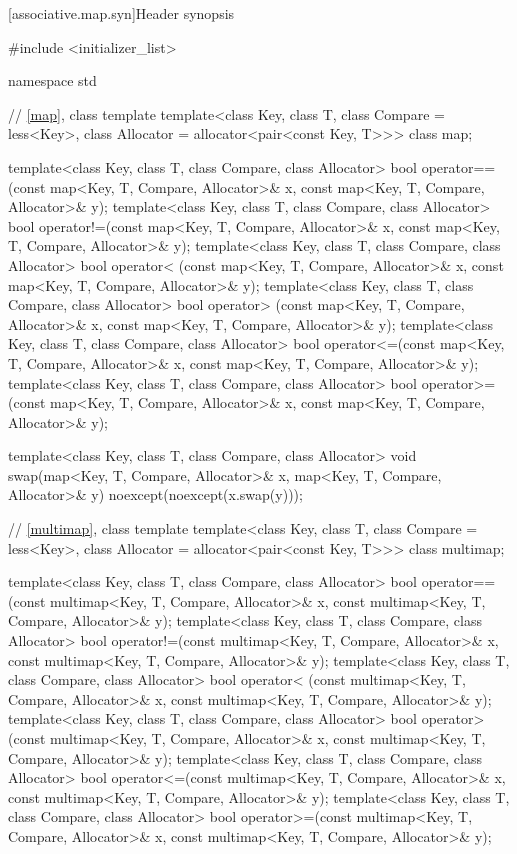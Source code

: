 [associative.map.syn]{Header  synopsis}

%
\begin{codeblock}
#include <initializer_list>

namespace std {
  // \ref{map}, class template 
  template<class Key, class T, class Compare = less<Key>,
           class Allocator = allocator<pair<const Key, T>>>
    class map;

  template<class Key, class T, class Compare, class Allocator>
    bool operator==(const map<Key, T, Compare, Allocator>& x,
                    const map<Key, T, Compare, Allocator>& y);
  template<class Key, class T, class Compare, class Allocator>
    bool operator!=(const map<Key, T, Compare, Allocator>& x,
                    const map<Key, T, Compare, Allocator>& y);
  template<class Key, class T, class Compare, class Allocator>
    bool operator< (const map<Key, T, Compare, Allocator>& x,
                    const map<Key, T, Compare, Allocator>& y);
  template<class Key, class T, class Compare, class Allocator>
    bool operator> (const map<Key, T, Compare, Allocator>& x,
                    const map<Key, T, Compare, Allocator>& y);
  template<class Key, class T, class Compare, class Allocator>
    bool operator<=(const map<Key, T, Compare, Allocator>& x,
                    const map<Key, T, Compare, Allocator>& y);
  template<class Key, class T, class Compare, class Allocator>
    bool operator>=(const map<Key, T, Compare, Allocator>& x,
                    const map<Key, T, Compare, Allocator>& y);

  template<class Key, class T, class Compare, class Allocator>
    void swap(map<Key, T, Compare, Allocator>& x,
              map<Key, T, Compare, Allocator>& y)
      noexcept(noexcept(x.swap(y)));

  // \ref{multimap}, class template 
  template<class Key, class T, class Compare = less<Key>,
           class Allocator = allocator<pair<const Key, T>>>
    class multimap;

  template<class Key, class T, class Compare, class Allocator>
    bool operator==(const multimap<Key, T, Compare, Allocator>& x,
                    const multimap<Key, T, Compare, Allocator>& y);
  template<class Key, class T, class Compare, class Allocator>
    bool operator!=(const multimap<Key, T, Compare, Allocator>& x,
                    const multimap<Key, T, Compare, Allocator>& y);
  template<class Key, class T, class Compare, class Allocator>
    bool operator< (const multimap<Key, T, Compare, Allocator>& x,
                    const multimap<Key, T, Compare, Allocator>& y);
  template<class Key, class T, class Compare, class Allocator>
    bool operator> (const multimap<Key, T, Compare, Allocator>& x,
                    const multimap<Key, T, Compare, Allocator>& y);
  template<class Key, class T, class Compare, class Allocator>
    bool operator<=(const multimap<Key, T, Compare, Allocator>& x,
                    const multimap<Key, T, Compare, Allocator>& y);
  template<class Key, class T, class Compare, class Allocator>
    bool operator>=(const multimap<Key, T, Compare, Allocator>& x,
                    const multimap<Key, T, Compare, Allocator>& y);

}
\end{codeblock}
